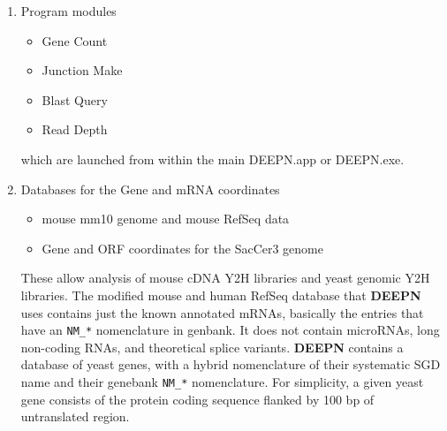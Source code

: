 \documentclass[11pt,fleqn]{book} %
\newcommand{\DEEPN}{\textbf{DEEPN }}
\begin{document}
\begin{enumerate}
\item Program modules
	\begin{itemize} 
		\item {\color{Red} Gene Count}
		\item {\color{Blue} Junction Make}
		\item {\color{ForestGreen} Blast Query}
		\item {\color{Bittersweet} Read Depth}
	\end{itemize}
which are launched from within the main DEEPN.app or DEEPN.exe.
\item Databases for the Gene and mRNA coordinates
	\begin{itemize} 
		\item mouse mm10 genome and mouse RefSeq data
		\item Gene and ORF coordinates for the SacCer3 genome
	\end{itemize}
These allow analysis of mouse cDNA Y2H libraries and yeast genomic Y2H libraries.  The modified mouse and human RefSeq database that \DEEPN uses contains just the known annotated mRNAs, basically the entries that have an \texttt{NM\_*} nomenclature in genbank.  It does not contain microRNAs, long non-coding RNAs, and theoretical splice variants. \DEEPN contains a database of yeast genes, with a hybrid nomenclature of their systematic SGD name and their genebank \texttt{NM\_*} nomenclature.  For simplicity, a given yeast gene consists of the protein coding sequence flanked by 100 bp of untranslated region.
	

\end{enumerate}
\end{document}
